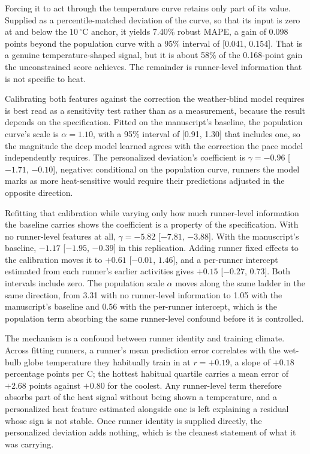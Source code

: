 \documentclass[11pt]{article}
\renewcommand{\_}{\textunderscore\allowbreak}
\begin{document}
Forcing it to act through the temperature curve retains only part of its value. Supplied as a percentile-matched deviation of the curve, so that its input is zero at and below the $10\,^{\circ}$C anchor, it yields 7.40\% robust MAPE, a gain of 0.098 points beyond the population curve with a 95\% interval of [0.041, 0.154]. That is a genuine temperature-shaped signal, but it is about 58\% of the 0.168-point gain the unconstrained score achieves. The remainder is runner-level information that is not specific to heat.

Calibrating both features against the correction the weather-blind model requires is best read as a sensitivity test rather than as a measurement, because the result depends on the specification. Fitted on the manuscript's baseline, the population curve's scale is $\alpha = 1.10$, with a 95\% interval of [0.91, 1.30] that includes one, so the magnitude the deep model learned agrees with the correction the pace model independently requires. The personalized deviation's coefficient is $\gamma = -0.96$ [$-1.71$, $-0.10$], negative: conditional on the population curve, runners the model marks as more heat-sensitive would require their predictions adjusted in the opposite direction.

Refitting that calibration while varying only how much runner-level information the baseline carries shows the coefficient is a property of the specification. With no runner-level features at all, $\gamma = -5.82$ [$-7.81$, $-3.88$]. With the manuscript's baseline, $-1.17$ [$-1.95$, $-0.39$] in this replication. Adding runner fixed effects to the calibration moves it to $+0.61$ [$-0.01$, $1.46$], and a per-runner intercept estimated from each runner's earlier activities gives $+0.15$ [$-0.27$, $0.73$]. Both intervals include zero. The population scale $\alpha$ moves along the same ladder in the same direction, from 3.31 with no runner-level information to 1.05 with the manuscript's baseline and 0.56 with the per-runner intercept, which is the population term absorbing the same runner-level confound before it is controlled.

The mechanism is a confound between runner identity and training climate. Across fitting runners, a runner's mean prediction error correlates with the wet-bulb globe temperature they habitually train in at $r = +0.19$, a slope of $+0.18$ percentage points per \textdegree C; the hottest habitual quartile carries a mean error of $+2.68$ points against $+0.80$ for the coolest. Any runner-level term therefore absorbs part of the heat signal without being shown a temperature, and a personalized heat feature estimated alongside one is left explaining a residual whose sign is not stable. Once runner identity is supplied directly, the personalized deviation adds nothing, which is the cleanest statement of what it was carrying.
\end{document}
